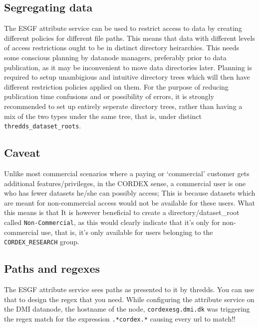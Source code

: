\subsection{Segregating data}
\label{segregatedata}
The ESGF attribute service can be used to restrict access to data by creating different policies for different file paths. This means that data with different levels of access restrictions ought to be in distinct directory heirarchies. This needs some conscious planning by datanode managers, preferably prior to data publication, as it may be inconvenient to move data directories later. Planning is required to setup unambigious and intuitive directory trees which will then have different restriction policies applied on them. For the purpose of reducing publication time confusions and or possibility of errors, it is strongly recommended to set up entirely seperate directory trees, rather than having a mix of the two types under the same tree, that is, under distinct  \texttt{thredds\_dataset\_roots}.
\subsection{Caveat}
Unlike most commercial scenarios where a paying or `commercial' customer gets additional features/privileges, in the CORDEX sense, a commercial user is one who has fewer datasets he/she can possibly access; This is because datasets which are meant for non-commercial access would not be available for these users.  What this means is that   It is however beneficial to create a directory/dataset\_root called \texttt{Non-Commercial}, as this would clearly indicate that it's only for non-commercial use, that is, it's only available for users belonging to the \texttt{CORDEX\_RESEARCH} group. 
\subsection{Paths and regexes}
The ESGF attribute service sees paths as presented to it by thredds. You can use that to design the regex that you need.  While configuring the attribute service on the DMI datanode, the hostname of the node, \texttt{cordexesg.dmi.dk} was triggering the regex match for the expression \texttt{.*cordex.*} causing every url to match!!
